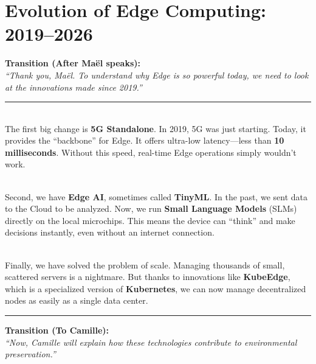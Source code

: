 \documentclass[12pt, a4paper]{article}
\begin{document}
\section*{Evolution of Edge Computing: 2019--2026}

\noindent \textbf{Transition (After Maël speaks):} \\
\textit{``Thank you, Maël. To understand why Edge is so powerful today, we need to look at the innovations made since 2019.''}

\vspace{1.5em}
\hrule
\vspace{1.5em}

\begin{description}[style=multiline, leftmargin=3.5cm, font=\bfseries\color{darkblue}]
    \item[Point 1: 5G Standalone (SA)] \hfill \\
    The first big change is \textbf{5G Standalone}. In 2019, 5G was just starting. Today, it provides the ``backbone'' for Edge. It offers ultra-low latency—less than \textbf{10 milliseconds}. Without this speed, real-time Edge operations simply wouldn't work.

    \item[Point 2: Edge AI \& TinyML] \hfill \\
    Second, we have \textbf{Edge AI}, sometimes called \textbf{TinyML}. In the past, we sent data to the Cloud to be analyzed. Now, we run \textbf{Small Language Models} (SLMs) directly on the local microchips. This means the device can ``think'' and make decisions instantly, even without an internet connection.

    \item[Point 3: Management \& Orchestration] \hfill \\
    Finally, we have solved the problem of scale. Managing thousands of small, scattered servers is a nightmare. But thanks to innovations like \textbf{KubeEdge}, which is a specialized version of \textbf{Kubernetes}, we can now manage decentralized nodes as easily as a single data center.
\end{description}

\vspace{1.5em}
\hrule
\vspace{1.5em}

\noindent \textbf{Transition (To Camille):} \\
\textit{``Now, Camille will explain how these technologies contribute to environmental preservation.''}
\end{document}
